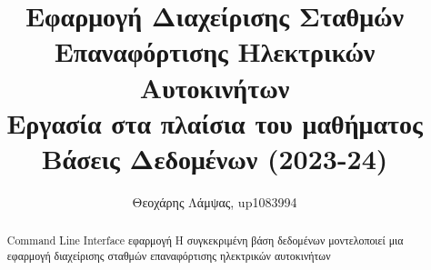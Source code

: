 \documentclass[manuscript,screen,review]{acmart}
\newcommand{\en}[1]{\foreignlanguage{english}{#1}}
\begin{document}
\title{Εφαρμογή Διαχείρισης Σταθμών Επαναφόρτισης Ηλεκτρικών Αυτοκινήτων  \\ Εργασία στα πλαίσια του μαθήματος Βάσεις Δεδομένων (2023-24)}





\author{Θεοχάρης Λάμψας, \en{up1083994}}



\begin{abstract}
\newline
 \en{Command Line Interface } εφαρμογή 
 Η συγκεκριμένη βάση δεδομένων μοντελοποιεί μια εφαρμογή
διαχείρισης σταθμών επαναφόρτισης ηλεκτρικών αυτοκινήτων
 \end{abstract}




\maketitle
\end{document}
